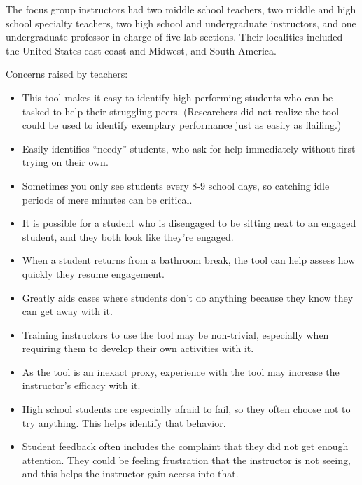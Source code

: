 The focus group instructors had two middle school teachers, two middle and high school specialty teachers, two high school and undergraduate instructors, and one undergraduate professor in charge of five lab sections. Their localities included the United States east coast and Midwest, and South America. 

Concerns raised by teachers: 
\begin{itemize}
\item This tool makes it easy to identify high-performing students who can be tasked to help their struggling peers. (Researchers did not realize the tool could be used to identify exemplary performance just as easily as flailing.)
\item Easily identifies ``needy'' students, who ask for help immediately without first trying on their own. %
\item Sometimes you only see students every 8-9 school days, so catching idle periods of mere minutes can be critical. 
\item It is possible for a student who is disengaged to be sitting next to an engaged student, and they both look like they're engaged.
\item When a student returns from a bathroom break, the tool can help assess how quickly they resume engagement.
\item Greatly aids cases where students don't do anything because they know they can get away with it.
\item Training instructors to use the tool may be non-trivial, especially when requiring them to develop their own activities with it. 
\item As the tool is an inexact proxy, experience with the tool may increase the instructor's efficacy with it.
\item High school students are especially afraid to fail, so they often choose not to try anything. This helps identify that behavior.
\item Student feedback often includes the complaint that they did not get enough attention. They could be feeling frustration that the instructor is not seeing, and this helps the instructor gain access into that.
\end{itemize}

